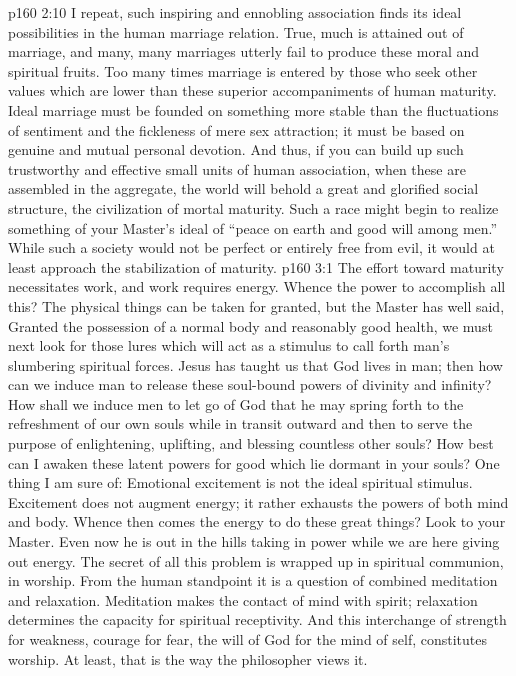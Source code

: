 \vs p160 2:10 \pc I repeat, such inspiring and ennobling association finds its ideal possibilities in the human marriage relation. True, much is attained out of marriage, and many, many marriages utterly fail to produce these moral and spiritual fruits. Too many times marriage is entered by those who seek other values which are lower than these superior accompaniments of human maturity. Ideal marriage must be founded on something more stable than the fluctuations of sentiment and the fickleness of mere sex attraction; it must be based on genuine and mutual personal devotion. And thus, if you can build up such trustworthy and effective small units of human association, when these are assembled in the aggregate, the world will behold a great and glorified social structure, the civilization of mortal maturity. Such a race might begin to realize something of your Master’s ideal of “peace on earth and good will among men.” While such a society would not be perfect or entirely free from evil, it would at least approach the stabilization of maturity.
\vs p160 3:1 The effort toward maturity necessitates work, and work requires energy. Whence the power to accomplish all this? The physical things can be taken for granted, but the Master has well said,  Granted the possession of a normal body and reasonably good health, we must next look for those lures which will act as a stimulus to call forth man’s slumbering spiritual forces. Jesus has taught us that God lives in man; then how can we induce man to release these soul\hyp{}bound powers of divinity and infinity? How shall we induce men to let go of God that he may spring forth to the refreshment of our own souls while in transit outward and then to serve the purpose of enlightening, uplifting, and blessing countless other souls? How best can I awaken these latent powers for good which lie dormant in your souls? One thing I am sure of: Emotional excitement is not the ideal spiritual stimulus. Excitement does not augment energy; it rather exhausts the powers of both mind and body. Whence then comes the energy to do these great things? Look to your Master. Even now he is out in the hills taking in power while we are here giving out energy. The secret of all this problem is wrapped up in spiritual communion, in worship. From the human standpoint it is a question of combined meditation and relaxation. Meditation makes the contact of mind with spirit; relaxation determines the capacity for spiritual receptivity. And this interchange of strength for weakness, courage for fear, the will of God for the mind of self, constitutes worship. At least, that is the way the philosopher views it.
